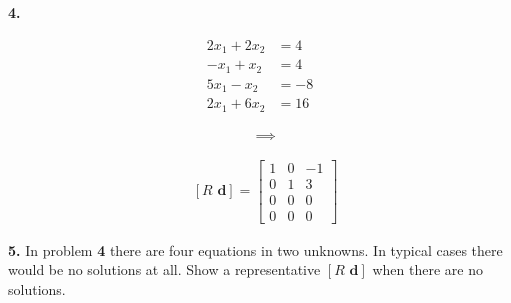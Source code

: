 \documentclass[12pt]{amsart}
\newcommand{\bd}{\mathbf{d}}
\newcommand{\prob}[1]{\bigskip\noindent\textbf{#1.}\quad }
\begin{document}
\prob{4}
\begin{minipage}[t]{3in}
\begin{align*}
2 x_1 + 2 x_2 &= 4 \\
-x_1  + x_2   &= 4 \\
5 x_1 - x_2   &= -8 \\
2 x_1 + 6 x_2 &= 16
\end{align*}
\end{minipage}
\begin{minipage}[t]{1in}
\begin{align*}
&\implies
\end{align*}
\end{minipage}
\begin{minipage}[t]{3in}
\medskip

\begin{align*}
&[R\,\,\bd] = \begin{bmatrix} 1 & 0 & -1 \\ 0 & 1 & 3 \\ 0 & 0 & 0 \\ 0 & 0 & 0 \end{bmatrix}
\end{align*}\end{minipage} 
\vfill

\prob{5}  In problem \textbf{4} there are four equations in two unknowns.  In typical cases there would be no solutions at all.  Show a representative $[R \,\,\bd]$ when there are no solutions.
\vspace{1.5in}
\end{document}
